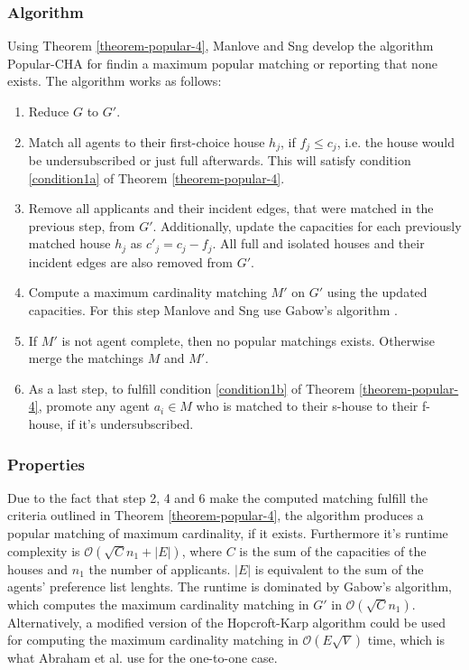 \subsubsection{Algorithm}
Using Theorem \ref{theorem-popular-4}, Manlove and Sng develop the algorithm Popular-CHA for findin a maximum popular matching or reporting that none exists.\cite{ManlovePopularMatchings} The algorithm works as follows:
\begin{enumerate}
    \item Reduce $G$ to $G'$.
    \item Match all agents to their first-choice house $h_j$, if $f_j \leq c_j$, i.e. the house would be undersubscribed or just full afterwards. This will satisfy condition \ref{condition1a} of Theorem \ref{theorem-popular-4}.
    \item Remove all applicants and their incident edges, that were matched in the previous step, from $G'$. Additionally, update the capacities for each previously matched house $h_j$ as $c'_j = c_j - f_j$. All full and isolated houses and their incident edges are also removed from $G'$.
    \item Compute a maximum cardinality matching $M'$ on $G'$ using the updated capacities. For this step Manlove and Sng use Gabow's algorithm \cite{Gabow1983}.
    \item If $M'$ is not agent complete, then no popular matchings exists. Otherwise merge the matchings $M$ and $M'$.
    \item As a last step, to fulfill condition \ref{condition1b} of Theorem \ref{theorem-popular-4}, promote any agent $a_i \in M$ who is matched to their s-house to their f-house, if it's undersubscribed. 
\end{enumerate}


\subsubsection{Properties}
Due to the fact that step 2, 4 and 6 make the computed matching fulfill the criteria outlined in Theorem \ref{theorem-popular-4}, the algorithm produces a popular matching of maximum cardinality, if it exists. Furthermore it's runtime complexity is $\mathcal{O}(\sqrt{C}n_1 + |E|)$, where $C$ is the sum of the capacities of the houses and $n_1$ the number of applicants. $|E|$ is equivalent to the sum of the agents' preference list lenghts. The runtime is dominated by Gabow's algorithm, which computes the maximum cardinality matching in $G'$ in $\mathcal{O}(\sqrt{C}n_1)$.\cite{ManlovePopularMatchings} Alternatively, a modified version of the Hopcroft-Karp algorithm could be used for computing the maximum cardinality matching in $\mathcal{O}(E\sqrt{V})$\cite{Hopcroft} time, which is what Abraham et al. use for the one-to-one case.